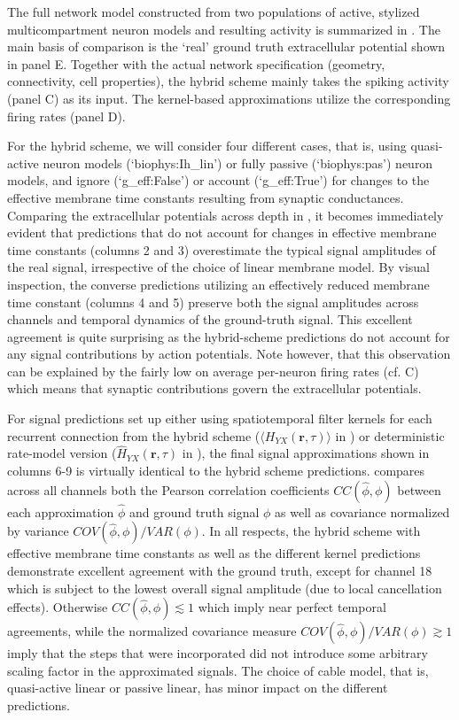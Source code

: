 The full network model constructed from two populations of active, stylized multicompartment neuron models and resulting activity is summarized in . 
The main basis of comparison is the `real' ground truth extracellular potential shown in panel E. 
Together with the actual network specification (geometry, connectivity, cell properties), 
the hybrid scheme mainly takes the spiking activity (panel C) as its input. 
The kernel-based approximations utilize the corresponding firing rates (panel D). 

For the hybrid scheme, 
we will consider four different cases, that is, using quasi-active neuron models (`biophys:Ih\_lin') or fully passive (`biophys:pas') neuron models, 
and ignore (`g\_eff:False') or account (`g\_eff:True') for changes to the effective membrane time constants resulting from synaptic conductances.  
Comparing the extracellular potentials across depth in ,
it becomes immediately evident that predictions that do not account for changes in effective membrane time constants (columns 2 and 3) overestimate the typical signal amplitudes of the real signal, 
irrespective of the choice of linear membrane model. 
By visual inspection, the converse predictions utilizing an effectively reduced membrane time constant (columns 4 and 5) preserve both the signal amplitudes across channels and temporal dynamics of the ground-truth signal. 
This excellent agreement is quite surprising as the hybrid-scheme predictions do not account for any signal contributions by action potentials. 
Note however, that this observation can be explained by the fairly low on average per-neuron firing rates (cf. C) which means that synaptic contributions govern the extracellular potentials.

For signal predictions set up either using spatiotemporal filter kernels for each recurrent connection from the hybrid scheme ($\langle H_{YX}(\mathbf{r}, \tau) \rangle$ in ) or deterministic rate-model version  ($\hat{H}_{YX}(\mathbf{r}, \tau)$ in ), 
the final signal approximations shown in  columns 6-9 is virtually identical to the hybrid scheme predictions. 
 compares across all channels both the Pearson correlation coefficients $CC(\hat{\phi}, \phi)$ between each approximation $\hat{\phi}$ and ground truth signal $\phi$ as well as covariance normalized by variance $COV(\hat{\phi}, \phi)/VAR(\phi)$. 
In all respects, the hybrid scheme with effective membrane time constants as well as the different kernel predictions demonstrate excellent agreement with the ground truth, except for channel 18 which is subject to the lowest overall signal amplitude (due to local cancellation effects). 
Otherwise $CC(\hat{\phi}, \phi) \lesssim 1$ which imply near perfect temporal agreements, 
while the normalized covariance measure $COV(\hat{\phi}, \phi)/VAR(\phi) \gtrsim 1$ imply that the steps that were incorporated did not introduce some arbitrary scaling factor in the approximated signals. 
The choice of cable model, that is, quasi-active linear or passive linear, has minor impact on the different predictions.   


